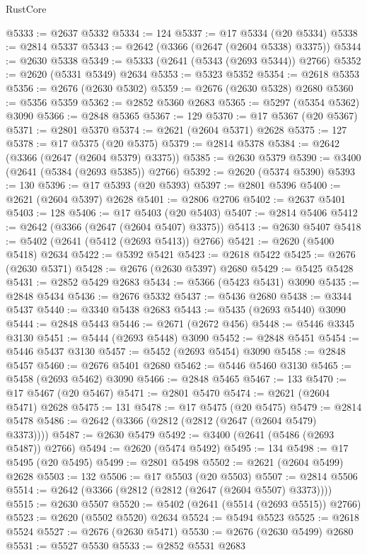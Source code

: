 \begin{lexlean}{RustCore}
\begin{coremodule}
@5333 := @2637 @5332
@5334 := 124
@5337 := @17 @5334 (@20 @5334)
@5338 := @2814 @5337
@5343 := @2642 (@3366 (@2647 (@2604 @5338) @3375))
@5344 := @2630 @5338
@5349 := @5333 (@2641 (@5343 (@2693 @5344)) @2766)
@5352 := @2620 (@5331 @5349) @2634
@5353 := @5323 @5352
@5354 := @2618 @5353
@5356 := @2676 (@2630 @5302)
@5359 := @2676 (@2630 @5328) @2680
@5360 := @5356 @5359
@5362 := @2852 @5360 @2683
@5365 := @5297 (@5354 @5362) @3090
@5366 := @2848 @5365
@5367 := 129
@5370 := @17 @5367 (@20 @5367)
@5371 := @2801 @5370
@5374 := @2621 (@2604 @5371) @2628
@5375 := 127
@5378 := @17 @5375 (@20 @5375)
@5379 := @2814 @5378
@5384 := @2642 (@3366 (@2647 (@2604 @5379) @3375))
@5385 := @2630 @5379
@5390 := @3400 (@2641 (@5384 (@2693 @5385)) @2766)
@5392 := @2620 (@5374 @5390)
@5393 := 130
@5396 := @17 @5393 (@20 @5393)
@5397 := @2801 @5396
@5400 := @2621 (@2604 @5397) @2628
@5401 := @2806 @2706
@5402 := @2637 @5401
@5403 := 128
@5406 := @17 @5403 (@20 @5403)
@5407 := @2814 @5406
@5412 := @2642 (@3366 (@2647 (@2604 @5407) @3375))
@5413 := @2630 @5407
@5418 := @5402 (@2641 (@5412 (@2693 @5413)) @2766)
@5421 := @2620 (@5400 @5418) @2634
@5422 := @5392 @5421
@5423 := @2618 @5422
@5425 := @2676 (@2630 @5371)
@5428 := @2676 (@2630 @5397) @2680
@5429 := @5425 @5428
@5431 := @2852 @5429 @2683
@5434 := @5366 (@5423 @5431) @3090
@5435 := @2848 @5434
@5436 := @2676 @5332
@5437 := @5436 @2680
@5438 := @3344 @5437
@5440 := @3340 @5438 @2683
@5443 := @5435 (@2693 @5440) @3090
@5444 := @2848 @5443
@5446 := @2671 (@2672 @456)
@5448 := @5446 @3345 @3130
@5451 := @5444 (@2693 @5448) @3090
@5452 := @2848 @5451
@5454 := @5446 @5437 @3130
@5457 := @5452 (@2693 @5454) @3090
@5458 := @2848 @5457
@5460 := @2676 @5401 @2680
@5462 := @5446 @5460 @3130
@5465 := @5458 (@2693 @5462) @3090
@5466 := @2848 @5465
@5467 := 133
@5470 := @17 @5467 (@20 @5467)
@5471 := @2801 @5470
@5474 := @2621 (@2604 @5471) @2628
@5475 := 131
@5478 := @17 @5475 (@20 @5475)
@5479 := @2814 @5478
@5486 := @2642 (@3366 (@2812 (@2812 (@2647 (@2604 @5479) @3373))))
@5487 := @2630 @5479
@5492 := @3400 (@2641 (@5486 (@2693 @5487)) @2766)
@5494 := @2620 (@5474 @5492)
@5495 := 134
@5498 := @17 @5495 (@20 @5495)
@5499 := @2801 @5498
@5502 := @2621 (@2604 @5499) @2628
@5503 := 132
@5506 := @17 @5503 (@20 @5503)
@5507 := @2814 @5506
@5514 := @2642 (@3366 (@2812 (@2812 (@2647 (@2604 @5507) @3373))))
@5515 := @2630 @5507
@5520 := @5402 (@2641 (@5514 (@2693 @5515)) @2766)
@5523 := @2620 (@5502 @5520) @2634
@5524 := @5494 @5523
@5525 := @2618 @5524
@5527 := @2676 (@2630 @5471)
@5530 := @2676 (@2630 @5499) @2680
@5531 := @5527 @5530
@5533 := @2852 @5531 @2683

\end{coremodule}
\end{lexlean}
